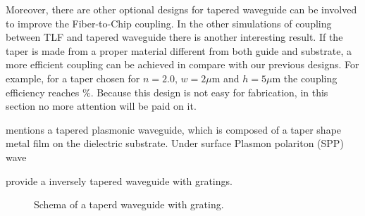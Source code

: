 Moreover, there are other optional designs for tapered waveguide can be involved to improve the Fiber-to-Chip coupling.  
In the other simulations of coupling between TLF and tapered waveguide there is another interesting result. If the taper is made from a proper material different from both guide and substrate, a more efficient coupling can be achieved in compare with our previous designs. For example, for a taper chosen for $n=2.0$, $w=2\mu$m and $h=5\mu$m the coupling efficiency reaches $\%$.  Because this design is not easy for fabrication, in this section no more attention will be paid on it.   

\cite{tapered_plasmonic_waveguides} mentions a tapered plasmonic waveguide, which is composed of a taper shape metal film on the dielectric substrate.  Under surface Plasmon polariton (SPP) wave 
 
\cite{fiber_to_chip_grating_waveguides} provide a inversely tapered waveguide with gratings.
\begin{figure}[!ht]
\centering
\caption{Schema of a taperd waveguide with grating.}
\label{fig:tapered_waveguide_dxx}
\end{figure}
